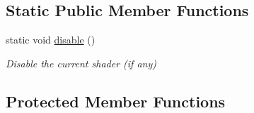\subsection*{Static Public Member Functions}
\begin{DoxyCompactItemize}
\item 
static void \hyperlink{class_graphics_1_1_shader_a788843bb4182207df3f8ae46cc5f2610}{disable} ()
\begin{DoxyCompactList}\small\item\em Disable the current shader (if any) \end{DoxyCompactList}\end{DoxyCompactItemize}
\subsection*{Protected Member Functions}
